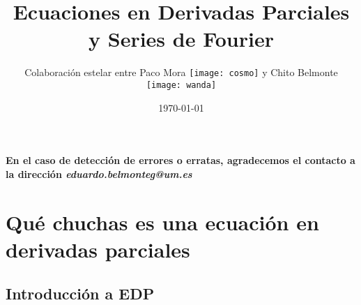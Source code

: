 \documentclass[openany]{book}
\title{Ecuaciones en Derivadas Parciales y Series de Fourier}
\author{Colaboración estelar entre Paco Mora \texttt{[image: cosmo]} y Chito Belmonte \texttt{[image: wanda]}}
\date{\today}
\begin{document}
\maketitle

\tableofcontents

\textbf{En el caso de detección de errores o erratas, agradecemos el contacto a la dirección \textit{eduardo.belmonteg@um.es}}

\chapter{Qué chuchas es una ecuación en derivadas parciales}

\section{Introducción a EDP}
\end{document}
